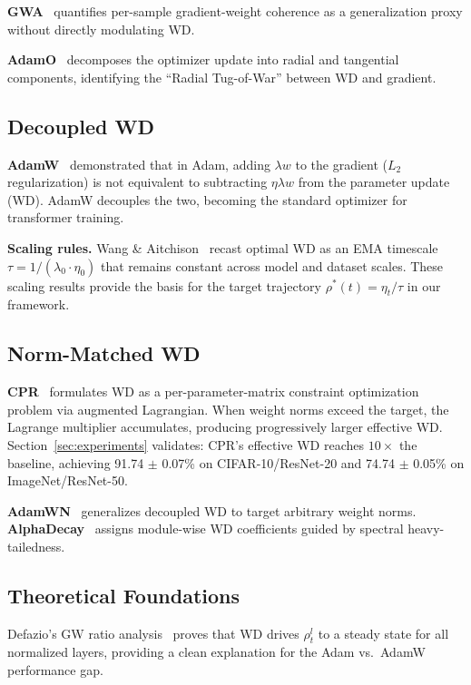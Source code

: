 \documentclass{article}
\begin{document}
\textbf{GWA}~\citep{holzl2025gwa} quantifies per-sample gradient-weight coherence as a generalization proxy without directly modulating WD.

\textbf{AdamO}~\citep{chen2026adamo} decomposes the optimizer update into radial and tangential components, identifying the ``Radial Tug-of-War'' between WD and gradient.

\subsection{Decoupled WD}

\textbf{AdamW}~\citep{loshchilov2019decoupled} demonstrated that in Adam, adding $\lambda w$ to the gradient ($L_2$ regularization) is not equivalent to subtracting $\eta \lambda w$ from the parameter update (WD). AdamW decouples the two, becoming the standard optimizer for transformer training.

\textbf{Scaling rules.} Wang \& Aitchison~\citep{wang2025ema} recast optimal WD as an EMA timescale $\tau = 1/(\lambda_0 \cdot \eta_0)$ that remains constant across model and dataset scales. These scaling results provide the basis for the target trajectory $\rho^*(t) = \eta_t / \tau$ in our framework.

\subsection{Norm-Matched WD}

\textbf{CPR}~\citep{franke2024cpr} formulates WD as a per-parameter-matrix constraint optimization problem via augmented Lagrangian. When weight norms exceed the target, the Lagrange multiplier accumulates, producing progressively larger effective WD. Section~\ref{sec:experiments} validates: CPR's effective WD reaches $10\times$ the baseline, achieving 91.74 $\pm$ 0.07\% on CIFAR-10/ResNet-20 and 74.74 $\pm$ 0.05\% on ImageNet/ResNet-50.

\textbf{AdamWN}~\citep{loshchilov2023adamwn} generalizes decoupled WD to target arbitrary weight norms. \textbf{AlphaDecay}~\citep{he2025alphadecay} assigns module-wise WD coefficients guided by spectral heavy-tailedness.

\subsection{Theoretical Foundations}

Defazio's GW ratio analysis~\citep{defazio2025gw} proves that WD drives $\rho_t^l$ to a steady state for all normalized layers, providing a clean explanation for the Adam vs.~AdamW performance gap.
\end{document}
